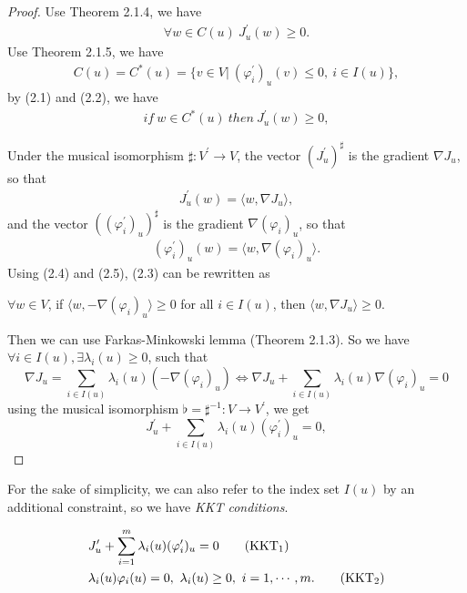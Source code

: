 \documentclass[a4paper]{report}
\begin{document}
\begin{proof}
    Use Theorem 2.1.4, we have
    \begin{align}
        \forall w\in C(u) \ J^\prime_u(w)\geq 0.
    \end{align}
    Use Theorem 2.1.5, we have
    \begin{align}
        C(u)=C^*(u)=\{ v\in V|\  (\varphi^\prime_i)_u(v)\leq 0, \ i\in I(u)\},
    \end{align}
    by (2.1) and (2.2), we have
    \begin{align}
        if\ w\in C^*(u)\ then\ J^\prime_u(w)\geq 0,
    \end{align}
    
    Under the musical isomorphism $\sharp:V^\prime\to V$, the vector $(J^\prime_u)^\sharp$ is the gradient $\nabla J_u$, so that
    \begin{align}
        J^\prime_u(w)=\langle w,\nabla J_u\rangle,
    \end{align}
    and the vector $((\varphi^\prime_i)_u)^\sharp$ is the gradient $\nabla(\varphi_i)_u$, so that
    \begin{align}
        (\varphi^\prime_i)_u(w)=\langle w,\nabla(\varphi_i)_u\rangle.
    \end{align}
    Using (2.4) and (2.5), (2.3) can be rewritten as 
    \begin{center}
        $\forall w\in V$, if $\langle w,-\nabla (\varphi_i)_u\rangle \geq 0$ for all $i\in I(u)$, then $\langle w, \nabla J_u\rangle \geq 0$.
    \end{center}
    Then we can use Farkas-Minkowski lemma (Theorem 2.1.3). So we have $\forall i\in I(u), \exists \lambda_i(u)\geq 0$, such that
    \[
        \nabla J_u = \sum_{i\in I(u)} \lambda_i(u) (-\nabla(\varphi_i)_u) \Leftrightarrow \nabla J_u+\sum_{i\in I(u)}\lambda_i(u)\nabla(\varphi_i)_u = 0
    \]
    using the musical isomorphism $\flat=\sharp^{-1}:V\to V^\prime$, we get
    \[
        J^\prime_u + \sum_{i\in I(u)}\lambda_i(u)(\varphi^\prime_i)_u=0,
    \]
\end{proof}

For the sake of simplicity, we can also refer to the index set $I(u)$ by an additional constraint, so we have \emph{KKT conditions}.

\begin{align}
    &J^\prime_u+\sum_{i=1}^m\lambda_i(u)(\varphi^\prime_i)_u=0 \tag{$\mathrm{KKT}_1$} \label{kkt1}\\
    &\lambda_i(u)\varphi_i(u)=0,\ \lambda_i(u)\geq 0,\ i=1,\cdots,m. \tag{$\mathrm{KKT}_2$} \label{kkt2}
\end{align}
\end{document}
